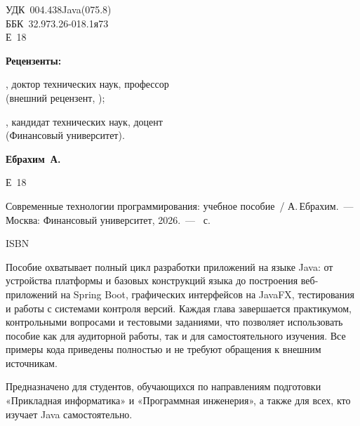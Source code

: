 \thispagestyle{empty}
\noindent

{\normalsize
УДК~004.438Java(075.8)\\
ББК~32.973.26-018.1я73\\
\phantom{ББК~}Е~18
\par}

\vspace{10mm}

\noindent\textbf{Рецензенты:}

\vspace{3mm}

\noindent
\underline{\hspace{75mm}}, доктор технических наук, профессор\\
(внешний рецензент, \underline{\hspace{55mm}});

\vspace{2mm}

\noindent
\underline{\hspace{75mm}}, кандидат технических наук, доцент\\
(Финансовый университет).

\vspace{14mm}

\noindent\textbf{Ебрахим~А.}

\vspace{2mm}

\noindent
Е~18\quad\parbox[t]{0.86\textwidth}{%
Современные технологии программирования: учебное пособие~/ А.\,Ебрахим.~---
Москва: Финансовый университет, 2026.~--- \underline{\hspace{10mm}}~с.
\par\vspace{3mm}
ISBN \underline{\hspace{45mm}}
}

\vspace{8mm}

\noindent\parbox{\textwidth}{%
\setlength{\parindent}{1.25cm}
Пособие охватывает полный цикл разработки приложений на языке Java: от устройства
платформы и базовых конструкций языка до построения веб-приложений на Spring Boot,
графических интерфейсов на JavaFX, тестирования и работы с системами контроля версий.
Каждая глава завершается практикумом, контрольными вопросами и тестовыми заданиями,
что позволяет использовать пособие как для аудиторной работы, так и для самостоятельного
изучения. Все примеры кода приведены полностью и не требуют обращения к внешним источникам.

Предназначено для студентов, обучающихся по направлениям подготовки «Прикладная
информатика» и «Программная инженерия», а также для всех, кто изучает Java
самостоятельно.
}

